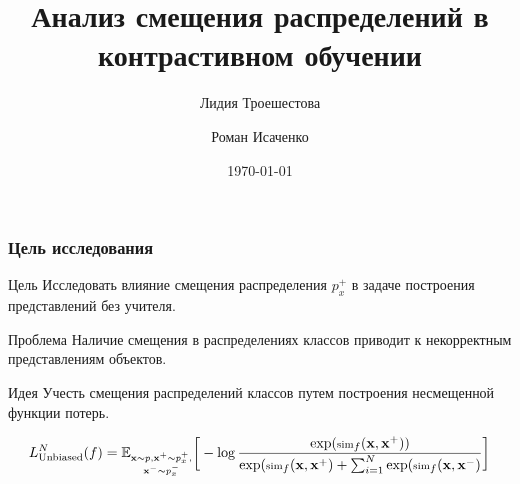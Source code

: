\documentclass[
	11pt, %
	t, %
        russian
]{beamer}
\title[]{Анализ смещения распределений в контрастивном обучении}
\author[Лидия Троешестова \and Роман Исаченко]{Лидия Троешестова \and Роман Исаченко}
\institute[]{Московский физико-технический институт}
\date[\today]{\today}
\begin{document}
\begin{frame}
	\titlepage %
\end{frame}


\begin{frame}
    \frametitle{Цель исследования}
\footnotesize
\begin{block}{ \small Цель}
Исследовать влияние смещения распределения $p_x^+$ в задаче построения представлений без учителя.
\end{block}

\begin{block}{ \small Проблема}
Наличие смещения в распределениях классов приводит к некорректным представлениям объектов.
\end{block}

\begin{block}{ \small Идея}
Учесть смещения распределений классов путем построения несмещенной функции потерь.
\end{block}

\begin{equation*} \small
L_{\text{Unbiased}}^N(f) = \mathbb{E}_{\substack{\mathbf{x} \sim p, \mathbf{x^+} \sim p^+_x,\\ \mathbf{x^-} \sim p_x^-}} \bigg[-\log \frac{\exp (\scriptsize\text{sim}_f(\mathbf{x}, \mathbf{x^+}))}{\exp (\scriptsize\text{sim}_f(\mathbf{x}, \mathbf{x^+}) + \sum _{i=1}^N \exp (\scriptsize\text{sim}_f(\mathbf{x}, \mathbf{x^-})}\bigg]
\end{equation*}

\end{frame}
\end{document}
